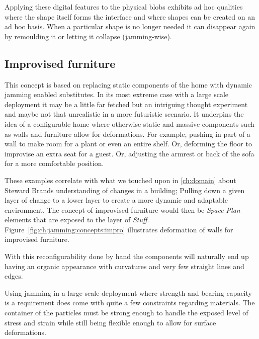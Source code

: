 Applying these digital features to the physical blobs exhibits ad hoc qualities where the shape itself forms the interface and where shapes can be created on an ad hoc basis.
When a particular shape is no longer needed it can disappear again by remoulding it or letting it collapse (jamming-wise).

\subsection{Improvised furniture}
\label{ch:jamming:concepts:improvised_furniture}

This concept is based on replacing static components of the home with dynamic jamming enabled substitutes.
In its most extreme case with a large scale deployment it may be a little far fetched but an intriguing thought experiment and maybe not that unrealistic in a more futuristic scenario.
It underpins the idea of a configurable home where otherwise static and massive components such as walls and furniture allow for deformations.
For example, pushing in part of a wall to make room for a plant or even an entire shelf.
Or, deforming the floor to improvise an extra seat for a guest.
Or, adjusting the armrest or back of the sofa for a more comfortable position.

These examples correlate with what we touched upon in \autoref{ch:domain} about Steward Brands understanding of changes in a building;
Pulling down a given layer of change to a lower layer to create a more dynamic and adaptable environment.
The concept of improvised furniture would then be \emph{Space Plan} elements that are exposed to the layer of \emph{Stuff}. 
Figure~\ref{fig:ch:jamming:concepts:impro} illustrates deformation of walls for improvised furniture.

With this reconfigurability done by hand the components will naturally end up having an organic appearance with curvatures and very few straight lines and edges.

Using jamming in a large scale deployment where strength and bearing capacity is a requirement does come with quite a few constraints regarding materials.
The container of the particles must be strong enough to handle the exposed level of stress and strain while still being flexible enough to allow for surface deformations.

